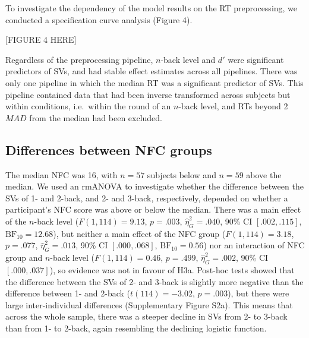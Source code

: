 \documentclass[
  man,floatsintext]{apa6}
\begin{document}
To investigate the dependency of the model results on the RT preprocessing, we conducted a specification curve analysis (Figure 4).

{[}FIGURE 4 HERE{]}

Regardless of the preprocessing pipeline, \(n\)-back level and \(d'\) were significant predictors of SVs, and had stable effect estimates across all pipelines.
There was only one pipeline in which the median RT was a significant predictor of SVs.
This pipeline contained data that had been inverse transformed across subjects but within conditions, i.e.~within the round of an \(n\)-back level, and RTs beyond 2 \(MAD\) from the median had been excluded.

\hypertarget{differences-between-nfc-groups}{%
\subsection{Differences between NFC groups}\label{differences-between-nfc-groups}}

The median NFC was 16, with \(n=57\) subjects below and \(n=59\) above the median.
We used an rmANOVA to investigate whether the difference between the SVs of 1- and 2-back, and 2- and 3-back, respectively, depended on whether a participant's NFC score was above or below the median.
There was a main effect of the \(n\)-back level (\(F(1, 114) = 9.13\), \(p = .003\), \(\hat{\eta}^2_G = .040\), 90\% CI \([.002, .115]\), \(\mathrm{BF}_{\textrm{10}} = 12.68\)), but neither a main effect of the NFC group (\(F(1, 114) = 3.18\), \(p = .077\), \(\hat{\eta}^2_G = .013\), 90\% CI \([.000, .068]\), \(\mathrm{BF}_{\textrm{10}} = 0.56\)) nor an interaction of NFC group and \(n\)-back level (\(F(1, 114) = 0.46\), \(p = .499\), \(\hat{\eta}^2_G = .002\), 90\% CI \([.000, .037]\)), so evidence was not in favour of H3a.
Post-hoc tests showed that the difference between the SVs of 2- and 3-back is slightly more negative than the difference between 1- and 2-back (\(t(114) = -3.02\), \(p = .003\)), but there were large inter-individual differences (Supplementary Figure S2a).
This means that across the whole sample, there was a steeper decline in SVs from 2- to 3-back than from 1- to 2-back, again resembling the declining logistic function.
\end{document}
